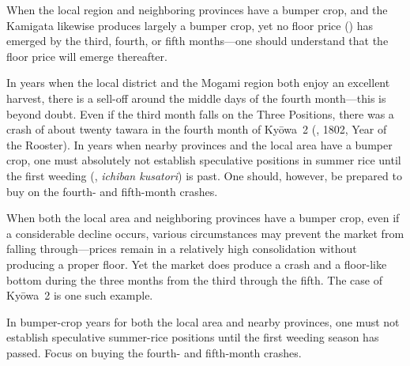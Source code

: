 
\begin{sokyubox}
{\small\itshape\color{sokyubar} }

\medskip
When the local region and neighboring provinces have a bumper crop, and
the Kamigata likewise produces largely a bumper crop, yet no floor price
() has emerged by the third, fourth, or fifth
months---one should understand that the floor price will emerge
thereafter.
\end{sokyubox}

\commentary
In years when the local district and the Mogami region both enjoy an
excellent harvest, there is a sell-off around the middle days of the
fourth month---this is beyond doubt. Even if the third month falls on
the Three Positions, there was a crash of about twenty tawara in the
fourth month of Ky\=owa~2 (, 1802, Year of the Rooster).
In years when nearby provinces and the local area have a bumper crop,
one must absolutely not establish speculative positions in summer rice
until the first weeding (, \textit{ichiban kusatori}) is
past. One should, however, be prepared to buy on the fourth- and
fifth-month crashes.

When both the local area and neighboring provinces have a bumper crop,
even if a considerable decline occurs, various circumstances may prevent
the market from falling through---prices remain in a relatively high
consolidation without producing a proper floor. Yet the market does
produce a crash and a floor-like bottom during the three months from the
third through the fifth. The case of Ky\=owa~2 is one such example.

In bumper-crop years for both the local area and nearby provinces, one
must not establish speculative summer-rice positions until the first
weeding season has passed. Focus on buying the fourth- and fifth-month
crashes.


